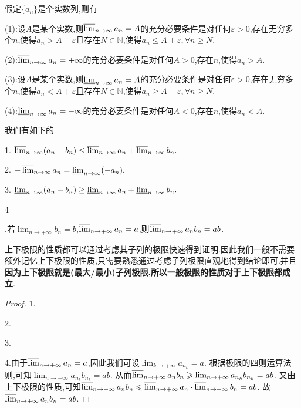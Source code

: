 \documentclass[lang=cn,newtx,10pt,scheme=chinese]{elegantbook}
\begin{document}
\begin{proposition}[上下极限的等价定义]\label{proposition:上下极限的等价定义}
假定\(\{a_n\}\)是个实数列,则有

(1):设\(A\)是某个实数,则\(\varlimsup_{n \to \infty} a_n = A\)的充分必要条件是对任何\(\varepsilon > 0\),存在无穷多个\(n\),使得\(a_n > A - \varepsilon\)且存在\(N \in \mathbb{N}\),使得\(a_n \leq A + \varepsilon, \forall n \geq N\).

(2):\(\varlimsup_{n \to \infty} a_n = +\infty\)的充分必要条件是对任何\(A > 0\),存在\(n\),使得\(a_n > A\).

(3):设\(A\)是某个实数,则\(\varliminf_{n \to \infty} a_n = A\)的充分必要条件是对任何\(\varepsilon > 0\),存在无穷多个\(n\),使得\(a_n < A + \varepsilon\)且存在\(N \in \mathbb{N}\),使得\(a_n \geq A - \varepsilon, \forall n \geq N\).

(4):\(\varliminf_{n \to \infty} a_n = -\infty\)的充分必要条件是对任何\(A < 0\),存在\(n\),使得\(a_n < A\).
\end{proposition}

\begin{proposition}[上下极限的性质]\label{proposition:上下极限的性质}
   我们有如下的
   
   1. $\varlimsup_{n \to \infty} (a_n + b_n) \leq \varlimsup_{n \to \infty} a_n + \varlimsup_{n \to \infty} b_n.$
   
   2. $-\varlimsup_{n \to \infty} a_n = \varliminf_{n \to \infty} (-a_n).$
   
   3. $\varliminf_{n \to \infty} (a_n + b_n) \geq \varliminf_{n \to \infty} a_n + \varliminf_{n \to \infty} b_n.$

   \hypertarget{上极限的性质命题(4)}{4}.若\(\lim_{n \to +\infty} b_n = b\),\(\varlimsup_{n \to +\infty} a_n = a\),则\(\varlimsup_{n \to +\infty} a_n b_n = ab\).
\end{proposition}
\begin{note}
   上下极限的性质都可以通过考虑其子列的极限快速得到证明.因此我们一般不需要额外记忆上下极限的性质,只需要熟悉通过考虑子列极限直观地得到结论即可.并且\textbf{因为上下极限就是(最大/最小)子列极限,所以一般极限的性质对于上下极限都成立}.
\end{note}
\begin{proof}
   1.

   2.

   3.

   4.由于\(\varlimsup_{n \to +\infty} a_n = a\),因此我们可设\(\lim_{k \to +\infty} a_{n_k} = a\).
   根据极限的四则运算法则,可知\(\lim_{n \to +\infty} a_{n_k} b_{n_k} = ab\).
   从而\(\varlimsup_{n \to +\infty} a_n b_n \geqslant \lim_{n \to +\infty} a_{n_k} b_{n_k} = ab\).
   又由上下极限的性质,可知\(\varlimsup_{n \to +\infty} a_n b_n \leqslant \varlimsup_{n \to +\infty} a_n \cdot \varlimsup_{n \to +\infty} b_n = ab\).
   故\(\varlimsup_{n \to +\infty} a_n b_n = ab\).
\end{proof}
\end{document}
